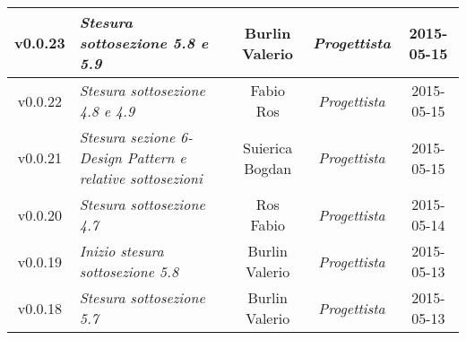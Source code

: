 \begin{table}[h]
\begin{tabular}{|c|p{}|c|c|c|}
	\midrule
		v0.0.23 & \textit{Stesura sottosezione 5.8 e 5.9} & Burlin Valerio & \textit{Progettista} & 2015-05-15\\
	\midrule
		v0.0.22 & \textit{Stesura sottosezione 4.8 e 4.9} & Fabio Ros & \textit{Progettista} & 2015-05-15\\
	\midrule
		v0.0.21 & \textit{Stesura sezione 6-Design Pattern e relative sottosezioni} & Suierica Bogdan & \textit{Progettista} & 2015-05-15\\
	\midrule
		v0.0.20 & \textit{Stesura sottosezione 4.7} & Ros Fabio & \textit{Progettista} & 2015-05-14\\
	\midrule
		v0.0.19 & \textit{Inizio stesura sottosezione 5.8} & Burlin Valerio & \textit{Progettista} & 2015-05-13\\
	\midrule
		v0.0.18 & \textit{Stesura sottosezione 5.7} & Burlin Valerio & \textit{Progettista} & 2015-05-13\\
	\bottomrule
\end{tabular}
\end{table}

\newpage

